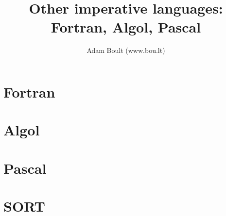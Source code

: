 \documentclass[oneside]{book}
\begin{document}
\author{Adam Boult (www.bou.lt)}
\title{Other imperative languages: Fortran, Algol, Pascal}
\maketitle

\setcounter{tocdepth}{0}
\tableofcontents



\part{Fortran}


\part{Algol}


\part{Pascal}


\part{SORT}

\end{document}
